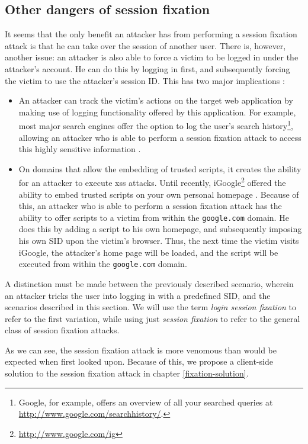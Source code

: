 \subsection{Other dangers of session fixation}

It seems that the only benefit an attacker has from performing a session fixation attack is that he can take over the session of another user. There is, however, another issue: an attacker is also able to force a victim to be logged in under the attacker's account. He can do this by logging in first, and subsequently forcing the victim to use the attacker's session ID. This has two major implications \cite{Barth2008}:
\begin{itemize}
	\item An attacker can track the victim's actions on the target web application by making use of logging functionality offered by this application. For example, most major search engines offer the option to log the user's search history\footnote{Google, for example, offers an overview of all your searched queries at \url{http://www.google.com/searchhistory/}.}, allowing an attacker who is able to perform a session fixation attack to access this highly sensitive information \cite{Barbaro2006}.
	\item On domains that allow the embedding of trusted scripts, it creates the ability for an attacker to execute \gls{xss} attacks. Until recently, iGoogle\footnote{\url{http://www.google.com/ig}} offered the ability to embed trusted scripts on your own personal homepage \cite{Barth2008}. Because of this, an attacker who is able to perform a session fixation attack has the ability to offer scripts to a victim from within the \texttt{google.com} domain. He does this by adding a script to his own homepage, and subsequently imposing his own SID upon the victim's browser. Thus, the next time the victim visits iGoogle, the attacker's home page will be loaded, and the script will be executed from within the \texttt{google.com} domain.
\end{itemize}
A distinction must be made between the previously described scenario, wherein an attacker tricks the user into logging in with a predefined SID, and the scenarios described in this section. We will use the term \emph{\gls{login session fixation}} to refer to the first variation, while using just \emph{session fixation} to refer to the general class of session fixation attacks.

As we can see, the session fixation attack is more venomous than would be expected when first looked upon. Because of this, we propose a client-side solution to the session fixation attack in chapter \ref{fixation-solution}.

